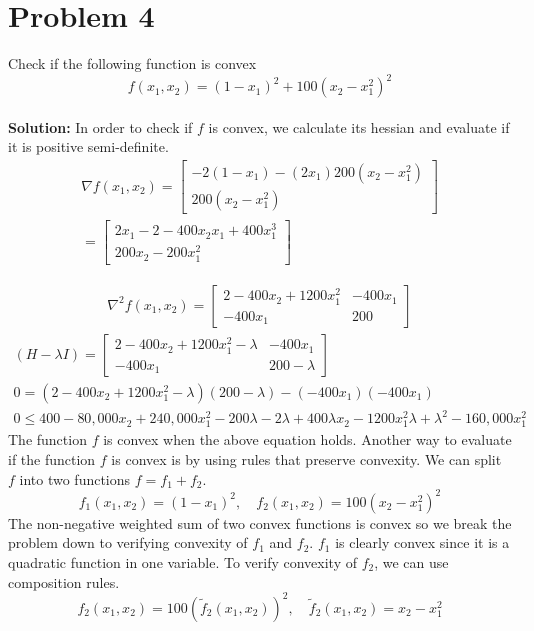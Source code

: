 \documentclass[11pt]{article}
\begin{document}
\section{Problem 4}
Check if the following function is convex
\begin{equation*}
  f(x_1, x_2) = (1 - x_1)^2 + 100(x_2 - x_1^2)^2
\end{equation*}
\\
\textbf{Solution: }
In order to check if $f$ is convex, we calculate its hessian and evaluate if it is positive semi-definite.
\begin{align*}
  \nabla f(x_1, x_2) = 
  \begin{bmatrix}
    -2(1-x_1) - (2x_1) 200(x_2 - x_1^2) \\
    200(x_2 - x_1^2)
  \end{bmatrix}
  \\
  = 
  \begin{bmatrix}
    2x_1-2 - 400x_2 x_1 + 400x_1^3 \\
    200x_2 - 200x_1^2
  \end{bmatrix}
\end{align*}

\begin{align*}
  \nabla^2 f (x_1, x_2) =
  \begin{bmatrix}
    2 - 400x_2 + 1200 x_1^2 & -400 x_1 \\
    -400x_1 & 200
  \end{bmatrix}
\end{align*}
\begin{align*}
  (H- \lambda I) =
  \begin{bmatrix}
    2 - 400x_2 + 1200 x_1^2 - \lambda & -400 x_1 \\
    -400x_1 & 200 - \lambda
  \end{bmatrix}
  \\
  0 = (2 - 400x_2 + 1200 x_1^2 - \lambda)(200 - \lambda) - (-400 x_1) (-400 x_1) \\
  0 \leq 400 - 80,000 x_2 + 240,000 x_1^2 - 200 \lambda - 2 \lambda + 400 \lambda x_2 - 1200 x_1^2 \lambda + \lambda^2 - 160,000 x_1 ^2
\end{align*}
The function $f$ is convex when the above equation holds.
Another way to evaluate if the function $f$ is convex is by using rules that preserve convexity.
We can split $f$ into two functions $f = f_1 + f_2$.
\begin{equation*}
  f_1(x_1, x_2) = (1-x_1)^2, \quad f_2(x_1, x_2) = 100(x_2 - x_1^2)^2
\end{equation*}  
The non-negative weighted sum of two convex functions is convex so we break the problem down to verifying convexity of $f_1$ and $f_2$.
$f_1$ is clearly convex since it is a quadratic function in one variable.
To verify convexity of $f_2$, we can use composition rules.
\begin{equation*}
  f_2(x_1, x_2) = 100(\tilde{f}_2(x_1, x_2))^2, \quad \tilde{f}_2(x_1, x_2) = x_2 - x_1^2
\end{equation*}
\end{document}
